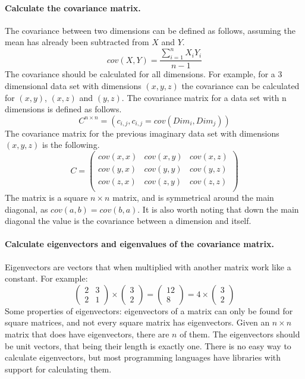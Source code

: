 \paragraph{Calculate the covariance matrix.}
The covariance between two dimensions can be defined as follows, assuming the mean has already been subtracted from $X$ and $Y$.
$$cov(X, Y) = \frac{\sum_{i=1}^{n} X_iY_i}{n-1}$$
The covariance should be calculated for all dimensions.
For example, for a 3 dimensional data set with dimensions $(x,y,z)$ the covariance can be calculated for $(x,y)$, $(x,z)$ and $(y,z)$.
The covariance matrix for a data set with n dimensions is defined as follows.
$$C^{n\times n} = (c_{i,j}, c_{i,j} = cov(Dim_i, Dim_j))$$
The covariance matrix for the previous imaginary data set with dimensions $(x,y,z)$ is the following.
$$
C= \begin{pmatrix}
cov(x,x) & cov(x,y) & cov(x,z) \\
cov(y,x) & cov(y,y) & cov(y,z) \\
cov(z,x) & cov(z,y) & cov(z,z) \\
\end{pmatrix}
$$
The matrix is a square $n\times n$ matrix, and is symmetrical around the main diagonal, as $cov(a,b) = cov(b,a)$.
It is also worth noting that down the main diagonal the value is the covariance between a dimension and itself.

\paragraph{Calculate eigenvectors and eigenvalues of the covariance matrix.}
Eigenvectors are vectors that when multiplied with another matrix work like a constant. For example:
$$
\begin{pmatrix}
2 & 3 \\
2 & 1
\end{pmatrix}
\times
\begin{pmatrix}
3\\
2
\end{pmatrix}
=
\begin{pmatrix}
12 \\
8
\end{pmatrix}
=
4 \times
\begin{pmatrix}
3 \\
2
\end{pmatrix}
$$
Some properties of eigenvectors: eigenvectors of a matrix can only be found for square matrices, and not every square matrix has eigenvectors. 
Given an $n\times n$ matrix that does have eigenvectors, there are $n$ of them.
The eigenvectors should be unit vectors, that being their length is exactly one.
There is no easy way to calculate eigenvectors, but most programming languages have libraries with support for calculating them.

